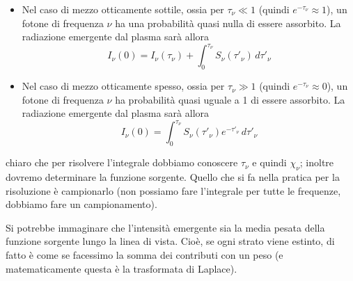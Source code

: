 \begin{itemize}
  \item Nel caso di mezzo otticamente sottile, ossia per $\tau_{\nu} \ll 1$ (quindi $e^{-\tau_{\nu}} \approx 1$), un fotone di frequenza $\nu$ ha una probabilità quasi nulla di essere assorbito. La radiazione emergente dal plasma sarà allora
  \begin{equation*}
    I_{\nu}(0)=I_{\nu}(\tau_{\nu}) + \int_{0}^{\tau_{\nu}} S_{\nu}(\tau'_{\nu}) \, d\tau'_{\nu}
  \end{equation*}
  \item Nel caso di mezzo otticamente spesso, ossia per $\tau_{\nu} \gg 1$ (quindi $e^{-\tau_{\nu}} \approx 0$), un fotone di frequenza $\nu$ ha probabilità quasi uguale a 1 di essere assorbito. La radiazione emergente dal plasma sarà allora
  \begin{equation*}
    I_{\nu}(0)=\int_{0}^{\tau_{\nu}} S_{\nu}(\tau'_{\nu}) e^{-\tau'_{\nu}} \, d\tau'_{\nu}
  \end{equation*}
\end{itemize}

\E chiaro che per risolvere l'integrale dobbiamo conoscere $\tau_\nu$ e quindi $\chi_\nu$; inoltre dovremo determinare la funzione sorgente. Quello che si fa nella pratica per la risoluzione è campionarlo (non possiamo fare l'integrale per tutte le frequenze, dobbiamo fare un campionamento).

Si potrebbe immaginare che l'intensità emergente sia la media pesata della funzione sorgente lungo la linea di vista. Cioè, se ogni strato viene estinto, di fatto è come se facessimo la somma dei contributi con un peso (e matematicamente questa è la trasformata di Laplace).



